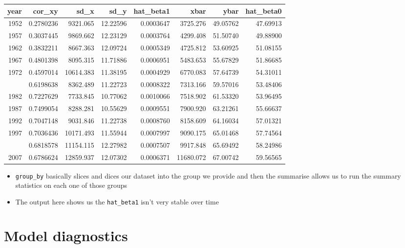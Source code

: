 \documentclass[
]{report}
\providecommand{\tightlist}{%
  \setlength{\itemsep}{0pt}\setlength{\parskip}{0pt}}
\theoremstyle{definition}
\theoremstyle{definition}
\theoremstyle{definition}
\theoremstyle{definition}
\theoremstyle{remark}
\begin{document}
\begin{tabular}{rrrrrrrr}
\toprule
year & cor\_xy & sd\_x & sd\_y & hat\_beta1 & xbar & ybar & hat\_beta0\\
\midrule
1952 & 0.2780236 & 9321.065 & 12.22596 & 0.0003647 & 3725.276 & 49.05762 & 47.69913\\
1957 & 0.3037445 & 9869.662 & 12.23129 & 0.0003764 & 4299.408 & 51.50740 & 49.88900\\
1962 & 0.3832211 & 8667.363 & 12.09724 & 0.0005349 & 4725.812 & 53.60925 & 51.08155\\
1967 & 0.4801398 & 8095.315 & 11.71886 & 0.0006951 & 5483.653 & 55.67829 & 51.86685\\
1972 & 0.4597014 & 10614.383 & 11.38195 & 0.0004929 & 6770.083 & 57.64739 & 54.31011\\
\addlinespace
1977 & 0.6198638 & 8362.489 & 11.22723 & 0.0008322 & 7313.166 & 59.57016 & 53.48406\\
1982 & 0.7227629 & 7733.845 & 10.77062 & 0.0010066 & 7518.902 & 61.53320 & 53.96495\\
1987 & 0.7499054 & 8288.281 & 10.55629 & 0.0009551 & 7900.920 & 63.21261 & 55.66637\\
1992 & 0.7047148 & 9031.846 & 11.22738 & 0.0008760 & 8158.609 & 64.16034 & 57.01321\\
1997 & 0.7036436 & 10171.493 & 11.55944 & 0.0007997 & 9090.175 & 65.01468 & 57.74564\\
\addlinespace
2002 & 0.6818578 & 11154.115 & 12.27982 & 0.0007507 & 9917.848 & 65.69492 & 58.24986\\
2007 & 0.6786624 & 12859.937 & 12.07302 & 0.0006371 & 11680.072 & 67.00742 & 59.56565\\
\bottomrule
\end{tabular}

\begin{itemize}
\tightlist
\item
  \texttt{group\_by} basically slices and dices our dataset into the group we provide
  and then the summarise allows us to run the summary statistics on each one of
  those groups
\item
  The output here shows us the \texttt{hat\_beta1} isn't very stable over time
\end{itemize}

\hypertarget{model-diagnostics}{%
\section{Model diagnostics}\label{model-diagnostics}}
\end{document}
